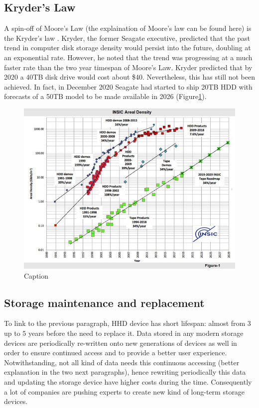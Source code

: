 \documentclass[10pt,twocolumn,twoside]{gsajnl}
\begin{document}
\subsection{Kryder's Law}
A spin-off of Moore’s Law (the explaination of Moore's law can be found here) is the Kryder's law \cite{walter2005kryder}. Kryder, the former Seagate executive, predicted that the past trend in computer disk storage density would persist into the future, doubling at an exponential rate. However, he noted that the trend was progressing at a much faster rate than the two year timespan of Moore’s Law. Kryder predicted that by 2020 a 40TB disk drive would cost about \$40.
Nevertheless, this has still not been achieved. In fact, in December 2020 Seagate had started to ship 20TB HDD with forecasts of a 50TB model to be made available in 2026 (Figure\ref{fig:my_label1}).
\begin{figure}[ht]
    \includegraphics[width=\linewidth]{Figures/LTO-chart.jpg}
    \caption{Caption}
    \centering
    \label{fig:my_label1}
\end{figure}
\subsection{Storage maintenance and replacement}
To link to the previous paragraph, HHD device has short lifespan: almost from 3 up to 5 years before the need to replace it. Data stored in any modern storage devices are periodically re-written onto new generations of devices as well in order to ensure continued access and to provide a better user experience.
Notwithstanding, not all kind of data needs this continuous accessing (better explanation in the two next paragraphs), hence rewriting periodically this data and updating the storage device have higher costs during the time. Consequently a lot of companies are pushing experts to create new kind of long-term storage devices.
\end{document}
